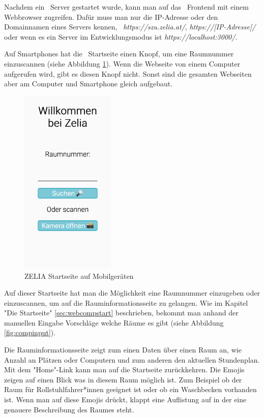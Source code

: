 Nachdem ein \ZELIA\ Server gestartet wurde, kann man auf das \ZELIA\ Frontend mit einem Webbrowser zugreifen. Dafür muss man nur die IP-Adresse oder den Domainnamen eines Servers kennen, \zb\ \emph{https://szu.zelia.at/}, \emph{https://[IP-Adresse]/} oder wenn es ein Server im Entwicklungsmodus ist \emph{https://localhost:3000/}.

Auf Smartphones hat die \ZELIA\ Startseite einen Knopf, um eine Raumnummer einzuscannen (siehe Abbildung \ref{fig:zeliastart}). Wenn die Webseite von einem Computer aufgerufen wird, gibt es diesen Knopf nicht. Sonst sind die gesamten Webseiten aber am Computer und Smartphone gleich aufgebaut.

\begin{figure}[H]
    \centering
    \includegraphics[height=90mm]{media/Handbuch/zelia_start.png}
    \caption{ZELIA Startseite auf Mobilgeräten}
    \label{fig:zeliastart}
\end{figure}

Auf dieser Startseite hat man die Möglichkeit eine Raumnummer einzugeben oder einzuscannen, um auf die Rauminformationsseite zu gelangen. Wie im Kapitel "Die Startseite" \ref{sec:webcompstart} beschrieben, bekommt man anhand der manuellen Eingabe Vorschläge welche Räume es gibt (siehe Abbildung \ref{fig:compinput}). 

Die Rauminformationsseite zeigt zum einen Daten über einen Raum an, wie Anzahl an Plätzen oder Computern und zum anderen den aktuellen Stundenplan. Mit dem "Home"-Link kann man auf die Startseite zurückkehren. Die Emojis zeigen auf einen Blick was in diesem Raum möglich ist. Zum Beispiel ob der Raum für Rollstuhlfahrer*innen geeignet ist oder ob ein Waschbecken vorhanden ist. Wenn man auf diese Emojis drückt, klappt eine Auflistung auf in der eine genauere Beschreibung des Raumes steht.

